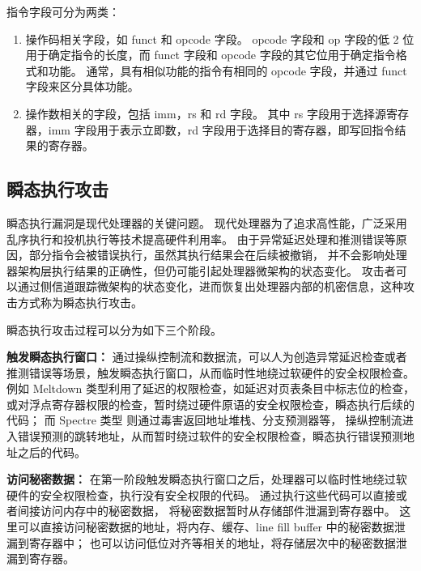 指令字段可分为两类：
\begin{enumerate}
    \item 操作码相关字段，如 funct 和 opcode 字段。
opcode 字段和 op 字段的低 2 位用于确定指令的长度，而 funct 字段和 opcode 字段的其它位用于确定指令格式和功能。
通常，具有相似功能的指令有相同的 opcode 字段，并通过 funct 字段来区分具体功能。\par
    \item 操作数相关的字段，包括 imm，rs 和 rd 字段。
其中 rs 字段用于选择源寄存器，imm 字段用于表示立即数，rd 字段用于选择目的寄存器，即写回指令结果的寄存器。\par
\end{enumerate}

\subsection{瞬态执行攻击}
瞬态执行漏洞是现代处理器的关键问题。
现代处理器为了追求高性能，广泛采用乱序执行和投机执行等技术提高硬件利用率。
由于异常延迟处理和推测错误等原因，部分指令会被错误执行，虽然其执行结果会在后续被撤销，
并不会影响处理器架构层执行结果的正确性，但仍可能引起处理器微架构的状态变化。
攻击者可以通过侧信道跟踪微架构的状态变化，进而恢复出处理器内部的机密信息，这种攻击方式称为瞬态执行攻击。\par

瞬态执行攻击过程可以分为如下三个阶段。\par

\textbf{触发瞬态执行窗口：}
通过操纵控制流和数据流，可以人为创造异常延迟检查或者推测错误等场景，触发瞬态执行窗口，从而临时性地绕过软硬件的安全权限检查。
例如 Meltdown 类型利用了延迟的权限检查，如延迟对页表条目中标志位的检查\cite{horn2018meltdown}，
或对浮点寄存器权限的检查\cite{stecklina1806lazyfp}，暂时绕过硬件原语的安全权限检查，瞬态执行后续的代码；
而 Spectre 类型\cite{kocher2020spectre} 则通过毒害返回地址堆栈\cite{maisuradze2018ret2spec}、分支预测器等，
操纵控制流进入错误预测的跳转地址，从而暂时绕过软件的安全权限检查，瞬态执行错误预测地址之后的代码。\par

\textbf{访问秘密数据：}
在第一阶段触发瞬态执行窗口之后，处理器可以临时性地绕过软硬件的安全权限检查，执行没有安全权限的代码。
通过执行这些代码可以直接或者间接访问内存中的秘密数据，
将秘密数据暂时从存储部件泄漏到寄存器中\cite{van2019ridl}\cite{van2021cacheout}。
这里可以直接访问秘密数据的地址，将内存、缓存、line fill buffer 中的秘密数据泄漏到寄存器中；
也可以访问低位对齐等相关的地址，将存储层次中的秘密数据泄漏到寄存器。

